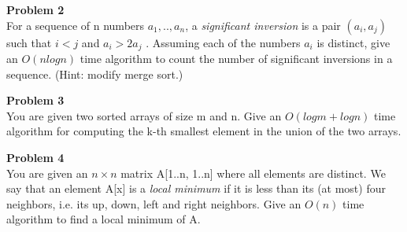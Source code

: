 \documentclass[12pt,article]{article}
\newenvironment{problem}[2][Problem]
    { \begin{mdframed}[backgroundcolor=gray!20] \textbf{#1 #2} \\}
    {  \end{mdframed}}
\begin{document}
\newpage
\begin{problem}{2} 
For a sequence of n numbers $a_1, .., a_n$, a \textit{significant inversion} is a pair $(a_i, a_j)$ such that $i < j$ and $a_i > 2a_j$ . Assuming each of the numbers $a_i$ is distinct, give an $O(nlogn)$ time algorithm to count the number of significant inversions in a sequence. (Hint: modify merge sort.)
\end{problem}

\newpage
\begin{problem}{3} 
You are given two sorted arrays of size m and n. Give an $O(logm + logn)$ time algorithm for computing the k-th smallest element in the union of the two arrays.
\end{problem}

\newpage
\begin{problem}{4} 
You are given an $n \times n$ matrix A[1..n, 1..n] where all elements are distinct. We say that an element A[x] is a \textit{local minimum} if it is less than its (at most) four neighbors, i.e. its up, down, left and right neighbors. Give an $O(n)$ time algorithm to find a local minimum of A.
\end{problem}



\end{document}
